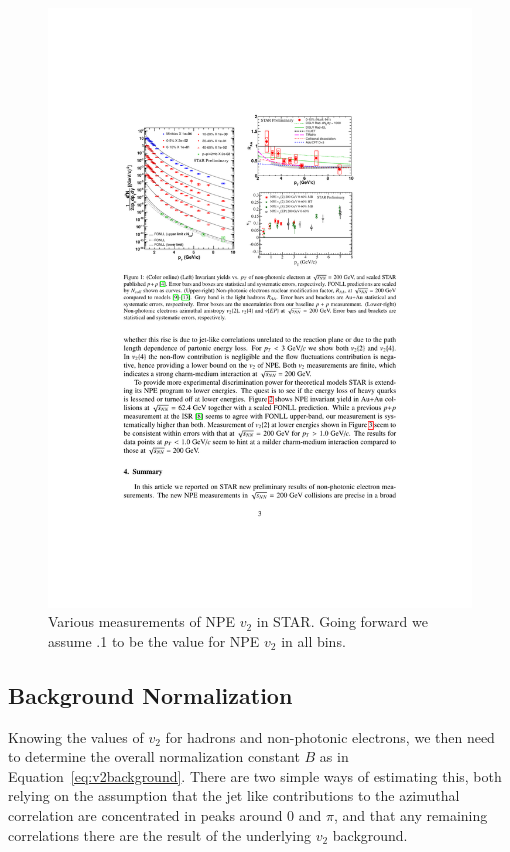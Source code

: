 \begin{figure}[htbp]
\begin{center}
\includegraphics[scale=2.0]{Plots/Correlations/STAR_NPE_v2.pdf}
\end{center}
\caption[STAR NPE $v_2$]{Various measurements of NPE $v_2$ in STAR. Going forward we assume .1 to be the value for NPE $v_2$ in all bins.}
\label{fig:STARNPEv2}
\end{figure}

\subsection{Background Normalization}

Knowing the values of $v_2$ for hadrons and non-photonic electrons, we then need to determine the overall normalization constant $B$ as in Equation~\ref{eq:v2background}. There are two simple ways of estimating this, both relying on the assumption that the jet like contributions to the azimuthal correlation are concentrated in peaks around 0 and $\pi$, and that any remaining correlations there are the result of the underlying $v_2$ background. 

